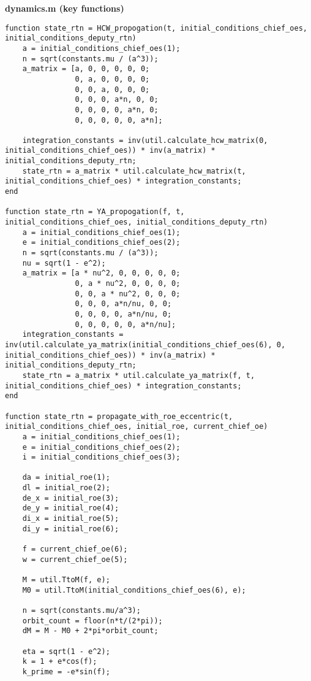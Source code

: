 \textbf{dynamics.m (key functions)}
\begin{lstlisting}
function state_rtn = HCW_propogation(t, initial_conditions_chief_oes, initial_conditions_deputy_rtn)
    a = initial_conditions_chief_oes(1);
    n = sqrt(constants.mu / (a^3));
    a_matrix = [a, 0, 0, 0, 0, 0;
                0, a, 0, 0, 0, 0;
                0, 0, a, 0, 0, 0;
                0, 0, 0, a*n, 0, 0;
                0, 0, 0, 0, a*n, 0;
                0, 0, 0, 0, 0, a*n];

    integration_constants = inv(util.calculate_hcw_matrix(0, initial_conditions_chief_oes)) * inv(a_matrix) * initial_conditions_deputy_rtn;
    state_rtn = a_matrix * util.calculate_hcw_matrix(t, initial_conditions_chief_oes) * integration_constants;
end

function state_rtn = YA_propogation(f, t, initial_conditions_chief_oes, initial_conditions_deputy_rtn)
    a = initial_conditions_chief_oes(1);
    e = initial_conditions_chief_oes(2);
    n = sqrt(constants.mu / (a^3));
    nu = sqrt(1 - e^2);
    a_matrix = [a * nu^2, 0, 0, 0, 0, 0;
                0, a * nu^2, 0, 0, 0, 0;
                0, 0, a * nu^2, 0, 0, 0;
                0, 0, 0, a*n/nu, 0, 0;
                0, 0, 0, 0, a*n/nu, 0;
                0, 0, 0, 0, 0, a*n/nu];
    integration_constants = inv(util.calculate_ya_matrix(initial_conditions_chief_oes(6), 0, initial_conditions_chief_oes)) * inv(a_matrix) * initial_conditions_deputy_rtn;
    state_rtn = a_matrix * util.calculate_ya_matrix(f, t, initial_conditions_chief_oes) * integration_constants;
end

function state_rtn = propagate_with_roe_eccentric(t, initial_conditions_chief_oes, initial_roe, current_chief_oe)
    a = initial_conditions_chief_oes(1);
    e = initial_conditions_chief_oes(2);
    i = initial_conditions_chief_oes(3);

    da = initial_roe(1);
    dl = initial_roe(2);
    de_x = initial_roe(3);
    de_y = initial_roe(4);
    di_x = initial_roe(5);
    di_y = initial_roe(6);

    f = current_chief_oe(6);
    w = current_chief_oe(5);
    
    M = util.TtoM(f, e);
    M0 = util.TtoM(initial_conditions_chief_oes(6), e);
    
    n = sqrt(constants.mu/a^3);
    orbit_count = floor(n*t/(2*pi));
    dM = M - M0 + 2*pi*orbit_count;

    eta = sqrt(1 - e^2);
    k = 1 + e*cos(f);
    k_prime = -e*sin(f);


\end{lstlisting}
